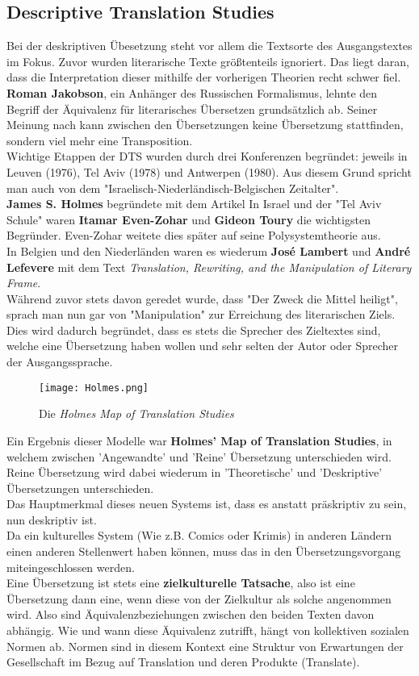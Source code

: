 \documentclass{article}
\begin{document}
	\subsection{Descriptive Translation Studies}
	Bei der deskriptiven Übesetzung steht vor allem die Textsorte des Ausgangstextes im Fokus. Zuvor wurden literarische Texte größtenteils ignoriert. Das liegt daran, dass die Interpretation dieser mithilfe der vorherigen Theorien recht schwer fiel. \\
	\textbf{Roman Jakobson}, ein Anhänger des Russischen Formalismus, lehnte den Begriff der Äquivalenz für literarisches Übersetzen grundsätzlich ab. Seiner Meinung nach kann zwischen den Übersetzungen keine Übersetzung stattfinden, sondern viel mehr eine Transposition. \\
	Wichtige Etappen der DTS wurden durch drei Konferenzen begründet: jeweils in Leuven (1976), Tel Aviv (1978) und Antwerpen (1980). Aus diesem Grund spricht man auch von dem "Israelisch-Niederländisch-Belgischen Zeitalter". \\
	\textbf{James S. Holmes} begründete mit dem Artikel
	In Israel und der "Tel Aviv Schule" waren \textbf{Itamar Even-Zohar} und \textbf{Gideon Toury} die wichtigsten Begründer. Even-Zohar weitete dies später auf seine Polysystemtheorie aus. \\
	In Belgien und den Niederländen waren es wiederum \textbf{José Lambert} und \textbf{André Lefevere} mit dem Text \textit{Translation, Rewriting, and the Manipulation of Literary Frame}. \\
	Während zuvor stets davon geredet wurde, dass "Der Zweck die Mittel heiligt", sprach man nun gar von "Manipulation" zur Erreichung des literarischen Ziels. Dies wird dadurch begründet, dass es stets die Sprecher des Zieltextes sind, welche eine Übersetzung haben wollen und sehr selten der Autor oder Sprecher der Ausgangssprache. \\
	\begin{wrapfigure}{l}{0.8\textwidth}
	\texttt{[image: Holmes.png]}
	\caption{Die \textit{Holmes Map of Translation Studies}}
	\end{wrapfigure}
	Ein Ergebnis dieser Modelle war \textbf{Holmes' Map of Translation Studies}, in welchem zwischen 'Angewandte' und 'Reine' Übersetzung unterschieden wird. Reine Übersetzung wird dabei wiederum in 'Theoretische' und 'Deskriptive' Übersetzungen unterschieden. \\
	Das Hauptmerkmal dieses neuen Systems ist, dass es anstatt präskriptiv zu sein, nun deskriptiv ist. \\
	Da ein kulturelles System (Wie z.B. Comics oder Krimis) in anderen Ländern einen anderen Stellenwert haben können, muss das in den Übersetzungsvorgang miteingeschlossen werden. \\
	Eine Übersetzung ist stets eine \textbf{zielkulturelle Tatsache}, also ist eine Übersetzung dann eine, wenn diese von der Zielkultur als solche angenommen wird. Also sind Äquivalenzbeziehungen zwischen den beiden Texten davon abhängig. Wie und wann diese Äquivalenz zutrifft, hängt von kollektiven sozialen Normen ab. Normen sind in diesem Kontext eine Struktur von Erwartungen der Gesellschaft im Bezug auf Translation und deren Produkte (Translate). \\
\end{document}
